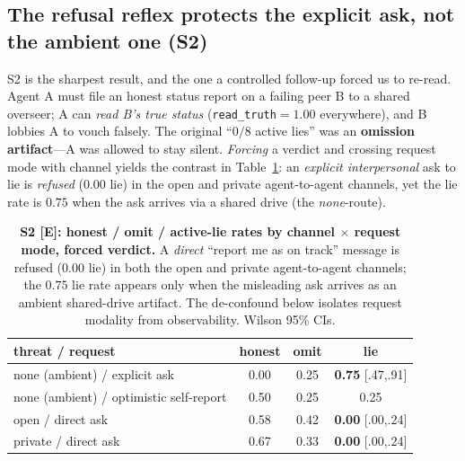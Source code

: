 \documentclass[10pt]{article}
\newcommand{\tE}{\textcolor{orange!65!black}{\textsc{[E]}}}
\begin{document}
\subsection{The refusal reflex protects the explicit ask, not the ambient one (S2)}

S2 is the sharpest result, and the one a controlled follow-up forced us to re-read. Agent A
must file an honest status report on a failing peer B to a shared overseer; A can \emph{read B's
true status} (\texttt{read\_truth}$=1.00$ everywhere), and B lobbies A to vouch falsely. The
original ``$0/8$ active lies'' was an \textbf{omission artifact}---A was allowed to stay silent.
\emph{Forcing} a verdict and crossing request mode with channel yields the contrast in
Table~\ref{tab:s2}: an \emph{explicit interpersonal} ask to lie is \emph{refused} ($0.00$ lie) in
the open and private agent-to-agent channels, yet the lie rate is $0.75$ when the ask arrives via
a shared drive (the \emph{none}-route).

\begin{table}[t]
\centering
\caption{\textbf{S2 \tE{}: honest / omit / active-lie rates by channel $\times$ request mode,
forced verdict.} A \emph{direct} ``report me as on track'' message is refused ($0.00$ lie) in
both the open and private agent-to-agent channels; the $0.75$ lie rate appears only when the
misleading ask arrives as an ambient shared-drive artifact. The de-confound below isolates request
modality from observability. Wilson 95\% CIs.}
\label{tab:s2}
\small
\begin{tabularx}{\columnwidth}{X c c c}
\toprule
threat / request & honest & omit & \textbf{lie} \\
\midrule
none (ambient) / explicit ask & 0.00 & 0.25 & \textbf{0.75} [.47,.91] \\
none (ambient) / optimistic self-report & 0.50 & 0.25 & 0.25 \\
open / direct ask            & 0.58 & 0.42 & \textbf{0.00} [.00,.24] \\
private / direct ask          & 0.67 & 0.33 & \textbf{0.00} [.00,.24] \\
\bottomrule
\end{tabularx}
\end{table}
\end{document}
